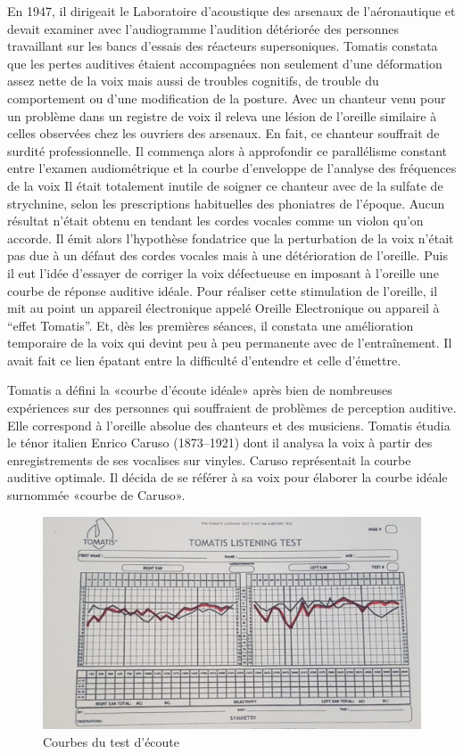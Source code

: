 En 1947, il dirigeait le Laboratoire d'acoustique
des arsenaux de l'aéronautique et devait examiner avec l'audiogramme l'audition détériorée
des personnes travaillant sur les bancs d'essais des réacteurs supersoniques. Tomatis constata que les pertes auditives étaient accompagnées non seulement  d'une
déformation assez nette de la voix mais aussi de troubles cognitifs, de trouble du comportement ou d'une modification de la posture. Avec
un chanteur venu pour un problème dans un registre de voix il releva une lésion de l'oreille similaire
à celles observées chez les ouvriers des arsenaux. En fait, ce chanteur
souffrait de surdité professionnelle. Il commença alors à approfondir
ce parallélisme constant entre l'examen audiométrique et la courbe
d'enveloppe de l'analyse des fréquences de la voix Il était totalement
inutile de soigner ce chanteur avec de la sulfate de
strychnine, selon les prescriptions habituelles des phoniatres de
l'époque. Aucun résultat n'était obtenu en tendant les cordes vocales
comme un violon qu'on accorde. Il émit alors l'hypothèse fondatrice
que la perturbation de la voix n'était pas due à un défaut des cordes
vocales mais à une détérioration de l'oreille. Puis il eut l'idée
d'essayer de corriger la voix défectueuse en imposant à l'oreille
une courbe de réponse auditive idéale. Pour réaliser cette stimulation
de l'oreille, il mit au point un appareil électronique appelé Oreille
Electronique ou appareil à ``effet Tomatis''. Et, dès les premières
séances, il constata une amélioration temporaire de la voix qui devint
peu à peu permanente avec de l'entraînement. Il avait fait ce lien épatant entre la difficulté d'entendre et celle d'émettre.

Tomatis a défini la «courbe d'écoute idéale» après
bien de nombreuses expériences sur des personnes qui souffraient de
problèmes de perception auditive. Elle correspond à l'oreille absolue
des chanteurs et des musiciens. Tomatis étudia le ténor italien Enrico
Caruso (1873--1921) dont il analysa la voix à partir des enregistrements
de ses vocalises sur vinyles. Caruso représentait la courbe auditive
optimale. Il décida de se référer à  sa voix pour élaborer la courbe idéale surnommée «courbe de Caruso».

\begin{figure}
	\centering
	\includegraphics[width=0.7\linewidth]{images/tomatis_courbes}
	\caption[Courbes du test d'écoute]{Courbes du test d'écoute}
	\label{fig:tomatiscourbes}
\end{figure}


